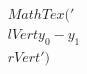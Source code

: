 \documentclass[preview]{standalone}
\begin{document}
\begin{align*}
MathTex('\\lVert y_0 - y_1 \\rVert')
\end{align*}
\end{document}
